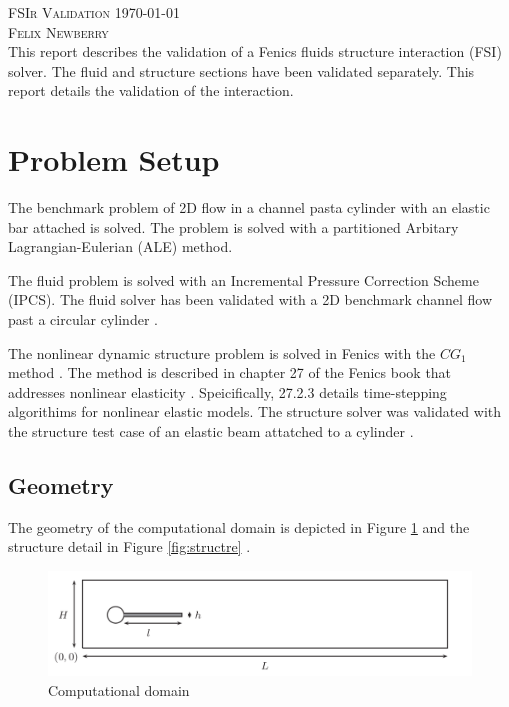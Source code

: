 \documentclass{article}
\begin{document}
\textsc{\Large FSIr Validation \hfill \today}\\[0.5cm] %
\textsc{\large Felix Newberry}\\

This report describes the validation of a Fenics fluids structure interaction (FSI) solver. The fluid and structure sections have been validated separately. This report details the validation of the interaction. 

\section{Problem Setup} 

The benchmark problem of 2D flow in a channel pasta  cylinder with an elastic bar attached is solved. The problem is solved with a partitioned  Arbitary Lagrangian-Eulerian (ALE) method. 

The fluid problem is solved with an Incremental Pressure Correction Scheme (IPCS). The fluid solver has been validated with a 2D benchmark channel flow past a circular cylinder \cite{schafer1996benchmark}. 

The nonlinear dynamic structure problem is solved in Fenics with the $CG_1$ method \cite{eriksson1996computational}. The method is described in chapter 27 of the Fenics book that addresses nonlinear elasticity \cite{logg2012automated}. Speicifically, 27.2.3 details time-stepping algorithims for nonlinear elastic models. The structure solver was validated with the structure test case of an elastic beam attatched to a cylinder \cite{turek2006proposal}. 

\subsection{Geometry}
The geometry of the computational domain is depicted in Figure \ref{fig:domain} and the structure detail in Figure \ref{fig:structre} \cite{turek2006proposal}. 

\FloatBarrier
\begin{figure}[h]
\centering
	\includegraphics[width=\textwidth]{domain}
	\caption{Computational domain \cite{turek2006proposal}}
	\label{fig:domain}
\end{figure}
\FloatBarrier
\end{document}
